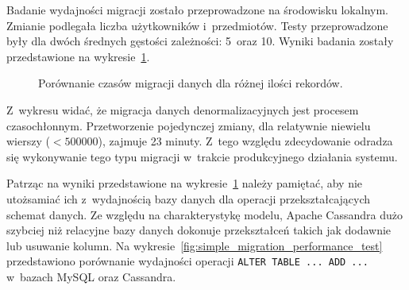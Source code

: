 Badanie wydajności migracji zostało przeprowadzone na środowisku lokalnym. Zmianie podlegała liczba użytkowników i~przedmiotów. Testy przeprowadzone były dla dwóch średnych gęstości zależności: 5~oraz 10. Wyniki badania zostały przedstawione na wykresie~\ref{fig:migration_performance_test}.

\begin{figure}[ht!]
	\centering

	\caption{Porównanie czasów migracji danych dla różnej ilości rekordów.}
	\label{fig:migration_performance_test}
\end{figure}

Z~wykresu widać, że migracja danych denormalizacyjnych jest procesem czasochłonnym. Przetworzenie pojedynczej zmiany, dla relatywnie niewielu wierszy ($< 500000$), zajmuje 23 minuty. Z~tego względu zdecydowanie odradza się wykonywanie tego typu migracji w~trakcie produkcyjnego działania systemu.

Patrząc na wyniki przedstawione na wykresie~\ref{fig:migration_performance_test} należy pamiętać, aby nie utożsamiać ich z~wydajnością bazy danych dla operacji przekształcających schemat danych. Ze względu na charakterystykę modelu, Apache Cassandra dużo szybciej niż relacyjne bazy danych dokonuje przekształceń takich jak dodawnie lub usuwanie kolumn. Na wykresie~\ref{fig:simple_migration_performance_test} przedstawiono porównanie wydajności operacji \verb+ALTER TABLE ... ADD ...+ w~bazach MySQL oraz Cassandra.

